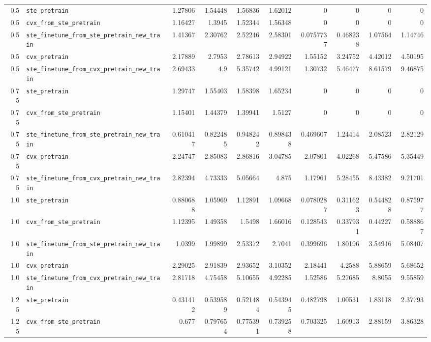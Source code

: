 \begin{longtable}{@{}r l *{8}{r}@{}}
0.5 & \texttt{ste\_pretrain} & 1.27806 & 1.54448 & 1.56836 & 1.62012 & 0 & 0 & 0 & 0 \\
0.5 & \texttt{cvx\_from\_ste\_pretrain} & 1.16427 & 1.3945 & 1.52344 & 1.56348 & 0 & 0 & 0 & 0 \\
0.5 & \texttt{ste\_finetune\_from\_ste\_pretrain\_new\_train} & 1.41367 & 2.30762 & 2.52246 & 2.58301 & 0.0757737 & 0.468238 & 1.07564 & 1.14746 \\
0.5 & \texttt{cvx\_pretrain} & 2.17889 & 2.7953 & 2.78613 & 2.94922 & 1.55152 & 3.24752 & 4.42012 & 4.50195 \\
0.5 & \texttt{ste\_finetune\_from\_cvx\_pretrain\_new\_train} & 2.69433 & 4.9 & 5.35742 & 4.99121 & 1.30732 & 5.46477 & 8.61579 & 9.46875 \\
0.75 & \texttt{ste\_pretrain} & 1.29747 & 1.55403 & 1.58398 & 1.65234 & 0 & 0 & 0 & 0 \\
0.75 & \texttt{cvx\_from\_ste\_pretrain} & 1.15401 & 1.44379 & 1.39941 & 1.5127 & 0 & 0 & 0 & 0 \\
0.75 & \texttt{ste\_finetune\_from\_ste\_pretrain\_new\_train} & 0.610417 & 0.822485 & 0.948242 & 0.898438 & 0.469607 & 1.24414 & 2.08523 & 2.82129 \\
0.75 & \texttt{cvx\_pretrain} & 2.24747 & 2.85083 & 2.86816 & 3.04785 & 2.07801 & 4.02268 & 5.47586 & 5.35449 \\
0.75 & \texttt{ste\_finetune\_from\_cvx\_pretrain\_new\_train} & 2.82394 & 4.73333 & 5.05664 & 4.875 & 1.17961 & 5.28455 & 8.43382 & 9.21701 \\
1.0 & \texttt{ste\_pretrain} & 0.880688 & 1.05969 & 1.12891 & 1.09668 & 0.0780287 & 0.311623 & 0.544828 & 0.875977 \\
1.0 & \texttt{cvx\_from\_ste\_pretrain} & 1.12395 & 1.49358 & 1.5498 & 1.66016 & 0.128543 & 0.337931 & 0.44227 & 0.588867 \\
1.0 & \texttt{ste\_finetune\_from\_ste\_pretrain\_new\_train} & 1.0399 & 1.99899 & 2.53372 & 2.7041 & 0.399696 & 1.80196 & 3.54916 & 5.08407 \\
1.0 & \texttt{cvx\_pretrain} & 2.29025 & 2.91839 & 2.93652 & 3.10352 & 2.18441 & 4.2588 & 5.88659 & 5.68652 \\
1.0 & \texttt{ste\_finetune\_from\_cvx\_pretrain\_new\_train} & 2.81718 & 4.75458 & 5.10655 & 4.92285 & 1.52586 & 5.27685 & 8.8055 & 9.55859 \\
1.25 & \texttt{ste\_pretrain} & 0.431412 & 0.539589 & 0.521484 & 0.543945 & 0.482798 & 1.00531 & 1.83118 & 2.37793 \\
1.25 & \texttt{cvx\_from\_ste\_pretrain} & 0.677 & 0.797654 & 0.775391 & 0.739258 & 0.703325 & 1.60913 & 2.88159 & 3.86328 \\

\end{longtable}
